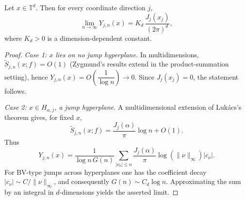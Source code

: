 \documentclass[10pt,a4paper]{amsart}
\begin{document}
\begin{lemma}
\label{lem:pointwise-hd}
Let \(x\in\mathbb{T}^d\). Then for every coordinate direction \(j\),
\begin{equation*}
  \lim_{n\to\infty} Y_{j,n}(x)
     = K_d\,\frac{J_j(x_j)}{(2\pi)^d},
\end{equation*}
where \(K_d>0\) is a dimension-dependent constant.
\end{lemma}

\begin{proof}
\emph{Case 1: \(x\) lies on no jump hyperplane.}
In multidimensions, \(\widetilde S_{j,n}(x;f)=O(1)\) (Zygmund's results extend in the product-summation setting), hence
\(Y_{j,n}(x)=O\!\left(\dfrac{1}{\log n}\right)\to 0\).
Since \(J_j(x_j)=0\), the statement follows.

\emph{Case 2: \(x\in H_{\alpha,j}\), a jump hyperplane.}
A multidimensional extension of Luk\'acs's theorem gives, for fixed \(x\),
\begin{equation*}
  \widetilde S_{j,n}(x;f)
    =\frac{J_j(\alpha)}{\pi}\log n +O(1).
\end{equation*}
Thus
\begin{equation*}
  Y_{j,n}(x)
  =
  \frac{1}{\log n\,G(n)}
  \sum_{|\nu_k|\le n}
  \frac{J_j(\alpha)}{\pi}\log(\|\nu\|_\infty)|c_\nu|.
\end{equation*}
For BV-type jumps across hyperplanes one has the coefficient decay
\(|c_\nu|\sim C/\|\nu\|_\infty\), and consequently \(G(n)\sim C_d\log n\).
Approximating the sum by an integral in \(d\)-dimensions yields the asserted limit.
\end{proof}
\end{document}
